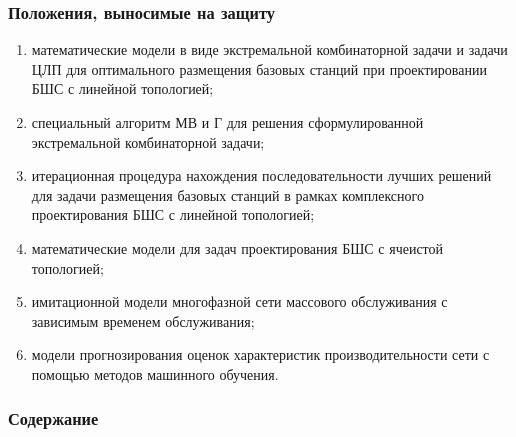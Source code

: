 \begin{frame}
    \setcounter{framenumber}{1}
    \maketitle
\end{frame}

\begin{frame}
    \frametitle{Положения, выносимые на защиту}
    \begin{enumerate} %
        \item математические модели в виде экстремальной комбинаторной задачи и
        задачи ЦЛП для оптимального размещения базовых станций при
        проектировании БШС с линейной топологией;
        \item специальный алгоритм МВ и Г для решения сформулированной
        экстремальной комбинаторной задачи;
        \item итерационная процедура нахождения последовательности лучших
        решений для задачи размещения базовых станций в рамках комплексного
        проектирования БШС с линейной топологией;
        \item математические модели для задач проектирования БШС с ячеистой
        топологией;
        \item имитационной модели многофазной сети массового обслуживания с
        зависимым временем обслуживания;
        \item модели прогнозирования оценок характеристик производительности сети с
        помощью методов машинного обучения.
      \end{enumerate}
\end{frame}

\begin{frame}
    \frametitle{Содержание}
    \tableofcontents
\end{frame}
